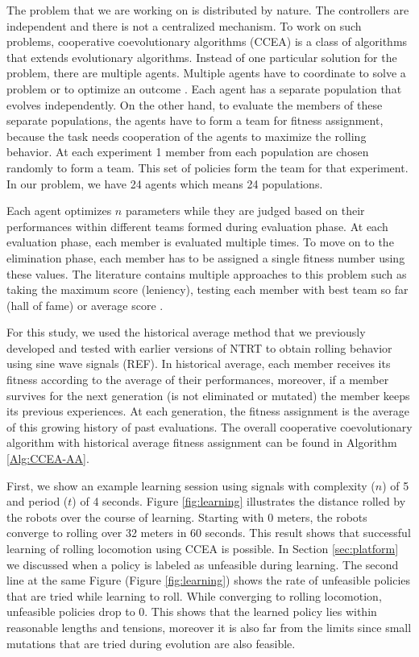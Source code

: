 \documentclass[twocolumn,10pt]{asme2ej}
\begin{document}
The problem that we are working on is distributed by nature. The controllers are independent and there is not a centralized mechanism. To work on such problems, cooperative coevolutionary algorithms (CCEA) is a class of algorithms that extends evolutionary algorithms. Instead of one particular solution for the problem, there are multiple agents. Multiple agents have to coordinate to solve a problem or to optimize an outcome \cite{wiegand2003analysis}. Each agent has a separate population that evolves independently. On the other hand, to evaluate the members of these separate populations, the agents have to form a team for fitness assignment, because the task needs cooperation of the agents to maximize the rolling behavior. At each experiment 1 member from each population are chosen randomly to form a team. This set of policies form the team for that experiment. In our problem, we have 24 agents which means 24 populations.

Each agent optimizes $n$ parameters while they are judged based on their performances within different teams formed during evaluation phase. At each evaluation phase, each member is evaluated multiple times. To move on to the elimination phase, each member has to be assigned a single fitness number using these values. The literature contains multiple approaches to this problem such as taking the maximum score (leniency), testing each member with best team so far (hall of fame) or average score \cite{wiegand2003analysis,panait2008theoretical,Iscen:2013aa}.

For this study, we used the historical average method that we previously developed and tested with earlier versions of NTRT to obtain rolling behavior using sine wave signals (REF). In historical average, each member receives its fitness according to the average of their performances, moreover, if a member survives for the next generation (is not eliminated or mutated) the member keeps  its previous experiences. At each generation, the fitness assignment is the average of this growing history of past evaluations. The overall cooperative coevolutionary algorithm with historical average fitness assignment can be found in Algorithm \ref{Alg:CCEA-AA}.



First, we show an example learning session using signals with complexity ($n$) of 5 and period ($t$) of 4 seconds.  Figure \ref{fig:learning} illustrates the distance rolled by the robots over the course of learning. Starting with 0 meters, the robots converge to rolling over 32 meters in 60 seconds. This result shows that successful learning of rolling locomotion using CCEA is possible. In Section \ref{sec:platform} we discussed when a policy is labeled as unfeasible during learning.  The second line at the same Figure (Figure \ref{fig:learning}) shows the rate of unfeasible policies that are tried while learning to roll. While converging to rolling locomotion, unfeasible policies drop to 0. This shows that the learned policy lies within reasonable lengths and tensions, moreover it is also far from the limits since small mutations that are tried during evolution are also feasible.
\end{document}
